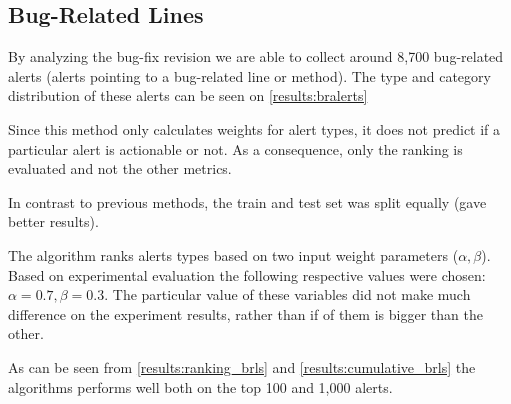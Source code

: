 \subsection{Bug-Related Lines}

By analyzing the bug-fix revision we are able to collect around 8,700 bug-related alerts (alerts pointing to a bug-related line or method). The type and category distribution of these alerts can be seen on \cref{results:bralerts}

Since this method only calculates weights for alert types, it does not predict if a particular alert is actionable or not. As a consequence, only the ranking is evaluated and not the other metrics.

In contrast to previous methods, the train and test set was split equally (gave better results). 

The algorithm ranks alerts types based on two input weight parameters ($\alpha,\beta$). Based on experimental evaluation the following respective values were chosen: $\alpha=0.7, 
\beta=0.3$. 
The particular value of these variables did not make much difference on the experiment results, rather than if of them is bigger than the other.

As can be seen from \cref{results:ranking_brls} and \cref{results:cumulative_brls} the algorithms performs well both on the top 100 and 1,000 alerts.

